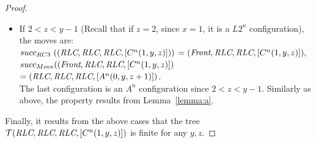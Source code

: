 \begin{proof}
\begin{itemize}[parsep=0cm, itemsep=0cm, topsep=0cm]
\item %
	If $2 < z < y-1$ (Recall that if $z=2$, since $x=1$, 
it is a $L2^n$ configuration), the moves are:\\
$succ_{RC3}~((\textit{RLC}, \textit{RLC}, \textit{RLC}, [C^n(1, y, z)]))$
$ = (\textit{Front}, \textit{RLC}, \textit{RLC}, [C^n(1, y, z)]), $\\
$ succ_{Move} (( \textit{Front}, \textit{RLC}, \textit{RLC}, [C^n(1, y, z)])$
$= (\textit{RLC}, \textit{RLC}, \textit{RLC}, [A^n(0, y, z+1)])$.\\
The last configuration is an $A^n$ configuration since $2<z<y-1$.
Similarly as above,  
the property results from Lemma~\ref{lemma:a}.
\end{itemize}
Finally, it results from the above cases that the tree
$\mathcal{T}(\textit{RLC}, \textit{RLC}, \textit{RLC}, [C^n(1, y, z)])$
 is finite for any $y, z$.



\end{proof}
